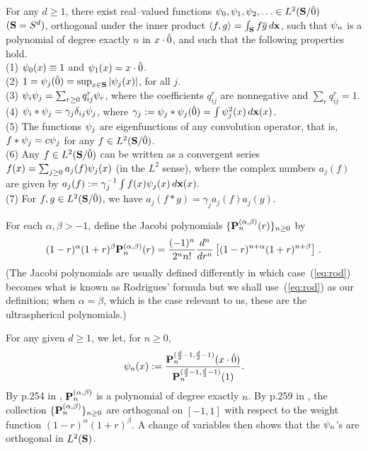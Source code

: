 \begin{lem} \label{lem:spherical} For any $d\ge 1$,
there exist real--valued functions $\f_0 , \f_1 , \f_2 , \ldots \in \ltsg$
$(\S=S^d)$,
orthogonal under the inner product 
$\langle f,g \rangle = \int_{\S} f \overline{g} \, \dx$, 
such that $\f_n$ is a polynomial of degree exactly $n$ in $x\cdot \zero$,
and such that the following properties hold. \\
(1) $\f_0 (x) \equiv 1$ and $\f_1 (x) = x \cdot \zero$. \\
(2) $1 = \f_j (\zero) = \sup_{x \in \S} |\f_j (x)|$, for all $j$. \\
(3) $\f_i \f_j = \sum_{r\ge 0} q^r_{ij} \f_r$, where the coefficients 
   $q^r_{ij}$ are nonnegative and $\sum_r q^r_{ij} = 1$. \\
(4) $\f_i * \f_j = \gamma_j \delta_{ij} \f_j$, where 
   $\gamma_j := \f_j * \f_j (\zero) = \int \f_j^2(x) \, \dx(x)$.  \\
(5) The functions $\f_j$ are eigenfunctions of any convolution
   operator, that is, $f * \f_j = c \f_j$ for any $f \in \ltsg$. \\
(6) Any $f \in \ltsg$ can be written as a convergent series 
   $f(x) = \sum_{j\ge 0} a_j (f) \f_j(x)$ (in the $L^2$ sense), 
where the complex numbers $a_j(f)$ 
are given by $a_j(f) : = \gamma_j^{-1} \int f(x) \f_j (x) \, \dx (x) .$ \\
(7) For $f,g \in \ltsg$, we have $a_j(f * g)= \gamma_j a_j(f) a_j(g)$.
\end{lem}

  For each $\alpha, \beta >-1$, define the 
Jacobi polynomials $\{\P^{(\alpha , \beta)}_n(r)\}_{n\ge 0}$ by
\begin{equation} \label{eq:rod}
(1 - r)^\alpha (1 + r)^\beta \P_n^{(\alpha , \beta)} (r) = 
   {(-1)^n \over 2^n n!} {d^n \over dr^n} \left [ (1 - r)^{n + \alpha}
   (1 + r)^{n + \beta} \right ] \, .
\end{equation}
(The Jacobi polynomials are usually defined differently in which
case~(\ref{eq:rod}) becomes what is known as Rodrigues' formula but we shall 
use~(\ref{eq:rod}) as our definition; when $\alpha=\beta$, which is the case 
relevant to us, these are the ultraspherical polynomials.)

For any given $d\ge 1$, we let, for $n\ge 0$,
$$
\f_n(x):=
{\P^{({d \over 2}-1 ,{d \over 2}-1)}_n (x\cdot \zero)
\over
\P^{({d \over 2}-1 ,{d \over 2}-1)}_n (1)}.
$$
By p.254 in \cite{R}, $\P^{(\alpha , \beta)}_n$ is a polynomial  of degree
exactly $n$.
By p.259 in \cite{R}, the collection $\{\P^{(\alpha , \beta)}_n\}_{n\ge 0}$ 
are orthogonal on $[-1,1]$ with respect to the weight function
$(1-r)^\alpha (1+r)^\beta$. A change of variables then shows that the $\f_n$'s
are orthogonal in $\lts$. 

